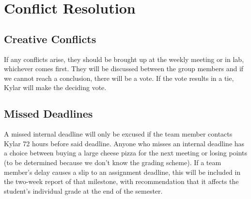 \documentclass[letterpaper,11pt]{texMemo}
\begin{document}
\section*{Conflict Resolution}

\subsection*{Creative Conflicts}
If any conflicts arise, they should be brought up at the weekly meeting or in 
lab, whichever comes first. They 
will be discussed between the group members and if we cannot reach a 
conclusion, there will be a vote. If the vote results in a tie, 
Kylar will make the deciding vote. 

\subsection*{Missed Deadlines}
A missed internal deadline will only be excused if the team member contacts 
Kylar 72 hours before said deadline. Anyone who misses an internal deadline 
has a choice between buying 
a large cheese pizza for the next meeting or losing points 
(to be determined because we don’t know the grading scheme). If a team member’s 
delay causes a slip to an assignment deadline, this will be included in the 
two-week report of that milestone, with recommendation that it affects the 
student’s individual grade at the end of the semester.
\end{document}
